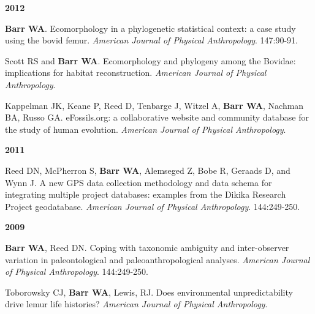 \documentclass{article}
\begin{document}
\begin{description*}
\begin{minipage}{\linewidth}
\item[] {\bfseries 2012}
\item[] {\bfseries Barr WA}. Ecomorphology in a phylogenetic statistical context: a case study using the bovid femur. \emph{American Journal of Physical Anthropology}. 147:90-91.

\item[] Scott RS and {\bfseries Barr WA}. Ecomorphology and phylogeny among the Bovidae: implications for habitat reconstruction. \emph{American Journal of Physical Anthropology}.

\item[] Kappelman JK, Keane P, Reed D, Tenbarge J, Witzel A, {\bfseries Barr WA}, Nachman BA, Russo GA. eFossils.org: a collaborative website and community database for the study of human evolution. \emph{American Journal of Physical Anthropology}.
\end{minipage}
\end{description*}



\begin{description*}
\begin{minipage}{\linewidth}
\item[] {\bfseries 2011}
\item[] Reed DN, McPherron S, {\bfseries Barr WA}, Alemseged Z, Bobe R, Geraads D, and Wynn J. A new GPS data collection methodology and data schema for integrating multiple project databases: examples from the Dikika Research Project geodatabase. \emph{American Journal of Physical Anthropology}. 144:249-250.
\end{minipage}
\end{description*}



\begin{description*}
\begin{minipage}{\linewidth}
\item[] {\bfseries 2009}
\item[] {\bfseries Barr WA}, Reed DN. Coping with taxonomic ambiguity and inter-observer variation in paleontological and paleoanthropological analyses. \emph{American Journal of Physical Anthropology}. 144:249-250.

\item[] Toborowsky CJ, {\bfseries Barr WA}, Lewis, RJ. Does environmental unpredictability drive lemur life histories? \emph{American Journal of Physical Anthropology}.
\end{minipage}
\end{description*}
\end{document}
